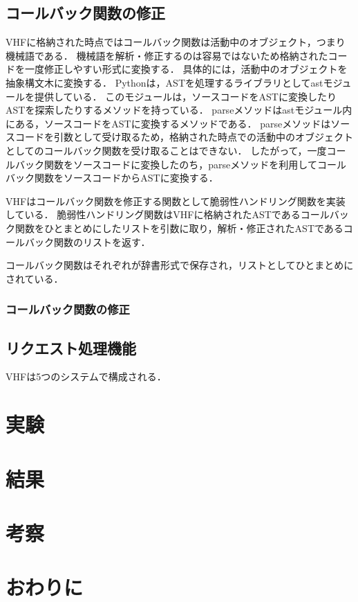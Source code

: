 \documentclass[a4paper,12pt]{jreport}
\begin{document}
\section{コールバック関数の修正}
VHFに格納された時点ではコールバック関数は活動中のオブジェクト，つまり機械語である．
機械語を解析・修正するのは容易ではないため格納されたコードを一度修正しやすい形式に変換する．
具体的には，活動中のオブジェクトを抽象構文木に変換する．
Pythonは，ASTを処理するライブラリとしてastモジュールを提供している．
このモジュールは，ソースコードをASTに変換したりASTを探索したりするメソッドを持っている．
parseメソッドはastモジュール内にある，ソースコードをASTに変換するメソッドである．
parseメソッドはソースコードを引数として受け取るため，格納された時点での活動中のオブジェクトとしてのコールバック関数を受け取ることはできない．
したがって，一度コールバック関数をソースコードに変換したのち，parseメソッドを利用してコールバック関数をソースコードからASTに変換する．

VHFはコールバック関数を修正する関数として脆弱性ハンドリング関数を実装している．
脆弱性ハンドリング関数はVHFに格納されたASTであるコールバック関数をひとまとめにしたリストを引数に取り，解析・修正されたASTであるコールバック関数のリストを返す．


コールバック関数はそれぞれが辞書形式で保存され，リストとしてひとまとめにされている．

\subsection{コールバック関数の修正}

\section{リクエスト処理機能}

VHFは5つのシステムで構成される．


\chapter{実験}

\chapter{結果}

\chapter{考察}

\chapter{おわりに}
\end{document}
